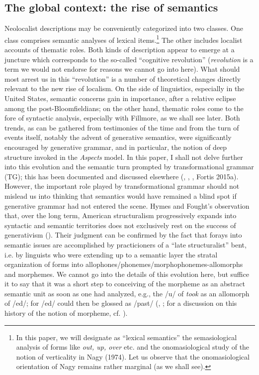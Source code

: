 \documentclass[output=paper]{langscibook}
\begin{document}
\subsection{The global context: the rise of semantics}
Neolocalist descriptions may be conveniently categorized into two classes. One class comprises semantic analyses of lexical items.\footnote{\textrm{ In this paper, we will designate as “lexical semantics” the semasiological analysis of forms like }\textrm{\textit{out, up, over}}\textrm{ etc. and the onomasiological study of the notion of verticality in Nagy (1974). Let us observe that the onomasiological orientation of Nagy remains rather marginal (as we shall see). }} The other includes localist accounts of thematic roles. Both kinds of description appear to emerge at a juncture which corresponds to the so-called “cognitive revolution” (\textit{revolution} is a term we would not endorse for reasons we cannot go into here). What should most arrest us in this “revolution” is a number of theoretical changes directly relevant to the new rise of localism. On the side of linguistics, especially in the United States, semantic concerns gain in importance, after a relative eclipse among the post-Bloomfieldians; on the other hand, thematic roles come to the fore of syntactic analysis, especially with Fillmore, as we shall see later. Both trends, as can be gathered from testimonies of the time and from the turn of events itself, notably the advent of generative semantics, were significantly encouraged by generative grammar, and in particular, the notion of deep structure invoked in the \textit{Aspects} model. In this paper, I shall not delve further into this evolution and the semantic turn prompted by transformational grammar (TG); this has been documented and discussed elsewhere (\citealt{newmeyer_linguistic_1986}, \citealt{harris_linguistic_1993}, \citealt{huck_ideology_1995}, Fortis 2015a). However, the important role played by transformational grammar should not mislead us into thinking that semantics would have remained a blind spot if generative grammar had not entered the scene. Hymes and Fought’s observation that, over the long term, American structuralism progressively expands into syntactic and semantic territories does not exclusively rest on the success of generativism (\citealt{hymes_american_1981}). Their judgment can be confirmed by the fact that forays into semantic issues are accomplished by practicioners of a “late structuralist” bent, i.e. by linguists who were extending up to a semantic layer the stratal organization of forms into allophones\slash phonemes\slash morphophonemes-allomorphs and morphemes. We cannot go into the details of this evolution here, but suffice it to say that it was a short step to conceiving of the morpheme as an abstract semantic unit as soon as one had analyzed, e.g., the /u/ of \textit{took} as an allomorph of /ed/; for /ed/ could then be glossed as /past/ (\citealt{hockett_two_1954}, \citealt{lamb_sememic_1964}; for a discussion on this history of the notion of morpheme, cf. \citealt{matthews_grammatical_1993}).
\end{document}
